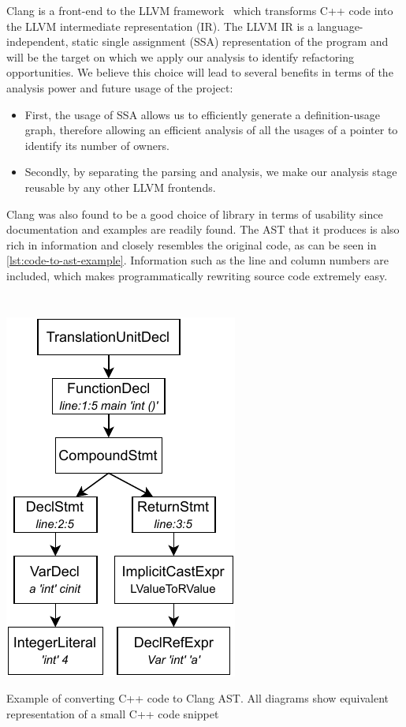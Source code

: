 \documentclass{proposal}
\begin{document}
    Clang is a front-end to the LLVM framework~\cite{Lattner2004} which transforms C++ code into the LLVM intermediate representation (IR).
    The LLVM IR is a language-independent, static single assignment (SSA) representation of the program and will be the target on which we apply our analysis to identify refactoring opportunities.
    We believe this choice will lead to several benefits in terms of the analysis power and future usage of the project:
    \begin{itemize}
        \item First, the usage of SSA allows us to efficiently generate a definition-usage graph, therefore allowing an efficient analysis of all the usages of a pointer to identify its number of owners.
        \item Secondly, by separating the parsing and analysis, we make our analysis stage reusable by any other LLVM frontends.
    \end{itemize}

    Clang was also found to be a good choice of library in terms of usability since documentation and examples are readily found.
    The AST that it produces is also rich in information and closely resembles the original code, as can be seen in \autoref{lst:code-to-ast-example}.
    Information such as the line and column numbers are included, which makes programmatically rewriting source code extremely easy.

    \begin{listing}
        \inputminted{c++}{code/code-to-ast.cpp}
        \inputminted[fontsize=\footnotesize]{text}{code/code-to-ast.txt}
        \centerline{\includegraphics{images/code-to-ast}}
        \caption{Example of converting C++ code to Clang AST. All diagrams show equivalent representation of a small C++ code snippet}
        \label{lst:code-to-ast-example}
    \end{listing}
\end{document}
